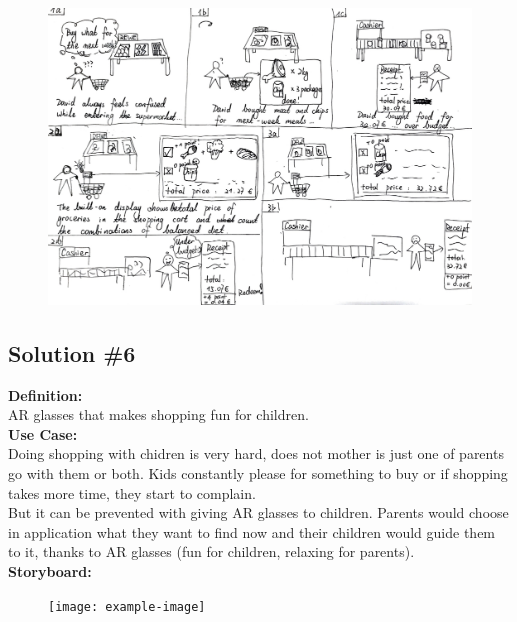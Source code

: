 \documentclass[a4paper,10pt,oneside]{scrreprt}
\begin{document}
				\begin{figure}[h]
					\centering
					\includegraphics[scale=0.4, clip, trim={0em 0em 0em 0em}]{images/s5.jpg}
				\end{figure}

			\clearpage
			
		\subsection{Solution \#6}
		
		\noindent \textbf{Definition:}\\
		AR glasses that makes shopping fun for children.\\
		
		
		\noindent \textbf{Use Case:}\\
		Doing shopping with chidren is very hard, does not mother is just one of parents go with them or both. Kids constantly please for something to buy or if shopping takes more time, they start to complain.\\
		
		But it can be prevented with giving AR glasses to children. Parents would choose in application what they want to find now and their children would guide them to it, thanks to AR glasses (fun for children, relaxing for parents).\\
		
		
		\noindent \textbf{Storyboard:}\\
		
		\begin{figure}[h]
			\centering
			\texttt{[image: example-image]}
		\end{figure}
		
\end{document}

